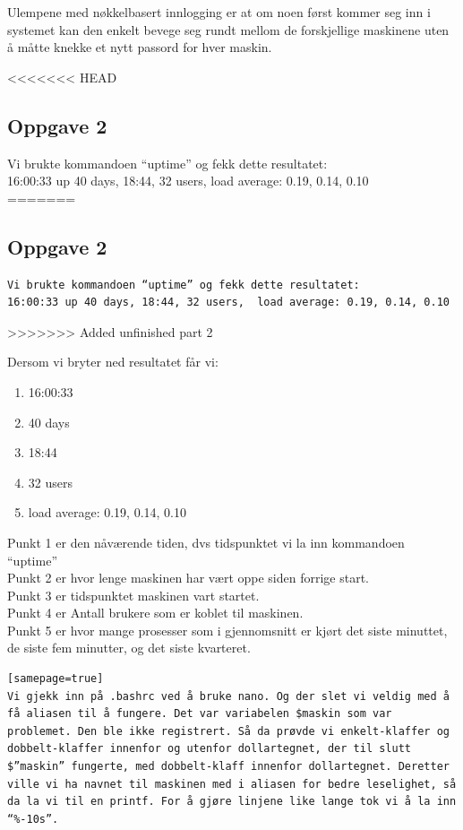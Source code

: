 \documentclass[a4paper, norsk, 12pt]{article}
\begin{document}
Ulempene med nøkkelbasert innlogging er at om noen først kommer seg inn i systemet kan den enkelt bevege seg rundt mellom de forskjellige maskinene uten å måtte knekke et nytt passord for hver maskin.

<<<<<<< HEAD
\subsection{Oppgave 2}
Vi brukte kommandoen “uptime” og fekk dette resultatet:\\
16:00:33 up 40 days, 18:44, 32 users,  load average: 0.19, 0.14, 0.10\\
=======
\subsection*{Oppgave 2}
\begin{verbatim}
Vi brukte kommandoen “uptime” og fekk dette resultatet:
16:00:33 up 40 days, 18:44, 32 users,  load average: 0.19, 0.14, 0.10
\end{verbatim}
>>>>>>> Added unfinished part 2

Dersom vi bryter ned resultatet får vi:\\
\begin{enumerate}
\item 16:00:33
\item 40 days
\item 18:44
\item 32 users
\item load average: 0.19, 0.14, 0.10
\end{enumerate}

Punkt 1 er den nåværende tiden, dvs tidspunktet vi la inn kommandoen “uptime”\\
Punkt 2 er hvor lenge maskinen har vært oppe siden forrige start.\\
Punkt 3 er tidspunktet maskinen vart startet.\\
Punkt 4 er Antall brukere som er koblet til maskinen.\\
Punkt 5 er hvor mange prosesser som i gjennomsnitt er kjørt det siste minuttet, de siste fem minutter, og det siste kvarteret.\\

\begin{verbatim}[samepage=true]
Vi gjekk inn på .bashrc ved å bruke nano. Og der slet vi veldig med å få aliasen til å fungere. Det var variabelen $maskin som var problemet. Den ble ikke registrert. Så da prøvde vi enkelt-klaffer og dobbelt-klaffer innenfor og utenfor dollartegnet, der til slutt $”maskin” fungerte, med dobbelt-klaff innenfor dollartegnet. Deretter ville vi ha navnet til maskinen med i aliasen for bedre leselighet, så da la vi til en printf. For å gjøre linjene like lange tok vi å la inn “%-10s”.
\end{verbatim}
\end{document}

